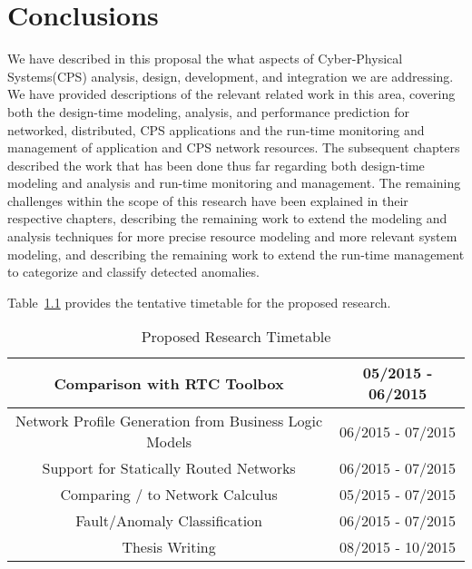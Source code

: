 \chapter{Conclusions}
\label{ch:conclusions}

We have described in this proposal the what aspects of Cyber-Physical Systems(CPS) analysis, design, development, and integration we are addressing.  We have provided descriptions of the relevant related work in this area, covering both the design-time modeling, analysis, and performance prediction for networked, distributed, CPS applications and the run-time monitoring and management of application and CPS network resources.  The subsequent chapters described the work that has been done thus far regarding both design-time modeling and analysis and run-time monitoring and management.  The remaining challenges within the scope of this research have been explained in their respective chapters, describing the remaining work to extend the modeling and analysis techniques for more precise resource modeling and more relevant system modeling, and describing the remaining work to extend the run-time management to categorize and classify detected anomalies.  

Table~\ref{table:timeline} provides the tentative timetable for the proposed research.
\begin{table}[h]
	\caption{Proposed Research Timetable}
	
	\begin{tabular}{| c | c |}
		\hline
		Comparison with RTC Toolbox & 05/2015 - 06/2015 \\\hline
		Network Profile Generation from Business Logic Models & 06/2015 - 07/2015 \\\hline
		Support for Statically Routed Networks & 06/2015 - 07/2015 \\\hline
		Comparing \shorttool/ to Network Calculus & 05/2015 - 07/2015 \\\hline
		Fault/Anomaly Classification & 06/2015 - 07/2015 \\\hline
		Thesis Writing & 08/2015 - 10/2015 \\\hline
	\end{tabular}
	\label{table:timeline}
\end{table}
